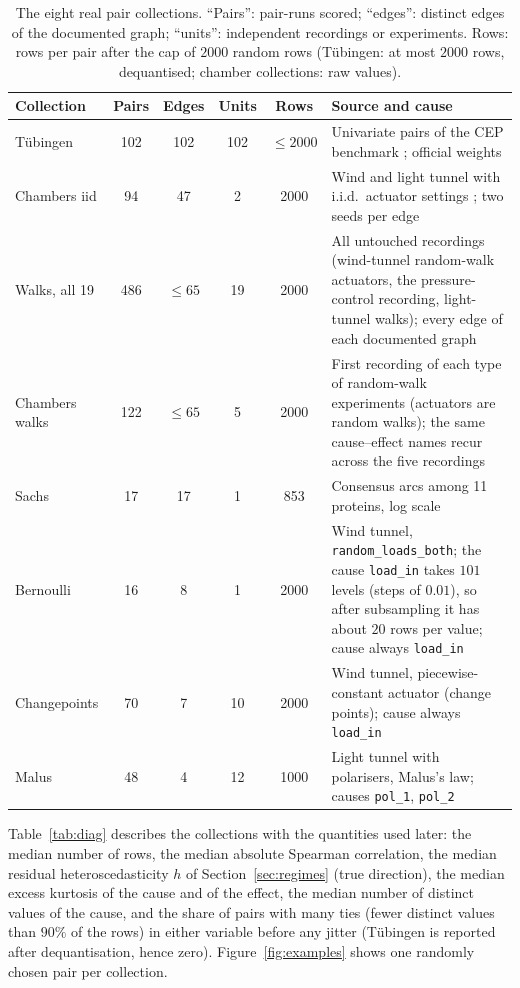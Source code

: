 \begin{table}[t]
\caption{The eight real pair collections. ``Pairs'': pair-runs scored; ``edges'': distinct edges of the documented graph; ``units'': independent recordings or experiments. Rows: rows per pair after the cap of $2000$ random rows (T\"ubingen: at most $2000$ rows, dequantised; chamber collections: raw values).}
\label{tab:collections}
\small
\begin{tabular}{@{}lccccp{5.6cm}@{}}
\toprule
Collection & Pairs & Edges & Units & Rows & Source and cause\\
\midrule
T\"ubingen & 102 & 102 & 102 & $\le 2000$ & Univariate pairs of the CEP benchmark \citep{mooij2016distinguishing}; official weights\\
Chambers iid & 94 & 47 & 2 & 2000 & Wind and light tunnel with i.i.d.\ actuator settings \citep{gamella2025chamber}; two seeds per edge\\
Walks, all 19 & 486 & $\le65$ & 19 & 2000 & All untouched recordings (wind-tunnel random-walk actuators, the pressure-control recording, light-tunnel walks); every edge of each documented graph\\
Chambers walks & 122 & $\le65$ & 5 & 2000 & First recording of each type of random-walk experiments (actuators are random walks); the same cause--effect names recur across the five recordings\\
Sachs & 17 & 17 & 1 & 853 & Consensus arcs among 11 proteins, log scale \citep{sachs2005causal}\\
Bernoulli & 16 & 8 & 1 & 2000 & Wind tunnel, \texttt{random\_loads\_both}; the cause \texttt{load\_in} takes $101$ levels (steps of $0.01$), so after subsampling it has about $20$ rows per value; cause always \texttt{load\_in}\\
Changepoints & 70 & 7 & 10 & 2000 & Wind tunnel, piecewise-constant actuator (change points); cause always \texttt{load\_in}\\
Malus & 48 & 4 & 12 & 1000 & Light tunnel with polarisers, Malus's law; causes \texttt{pol\_1}, \texttt{pol\_2}\\
\bottomrule
\end{tabular}
\end{table}

Table~\ref{tab:diag} describes the collections with the quantities used later: the median number of rows, the median absolute Spearman correlation, the median residual heteroscedasticity $h$ of Section~\ref{sec:regimes} (true direction), the median excess kurtosis of the cause and of the effect, the median number of distinct values of the cause, and the share of pairs with many ties (fewer distinct values than $90\%$ of the rows) in either variable before any jitter (T\"ubingen is reported after dequantisation, hence zero). Figure~\ref{fig:examples} shows one randomly chosen pair per collection.

